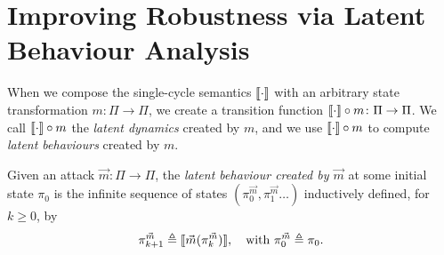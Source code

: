 {\section{Improving Robustness via Latent Behaviour Analysis}
\label{sec:CPSRobustness:LatentBehaviours} 
When we compose the single-cycle semantics ${{{\llbracket\cdot\rrbracket}}}$ with an arbitrary state transformation $m\colon \Pi\rightarrow\Pi$, we create a transition function ${{{\llbracket\cdot\rrbracket}}}\circ m\colon\Pi\rightarrow\Pi$. We call ${{{\llbracket\cdot\rrbracket}}}\circ m$ the \emph{latent dynamics} created by $m$, and we use ${{{\llbracket\cdot\rrbracket}}}\circ m$ to compute \emph{latent behaviours} created by $m$.%

\begin{definition}
  \label{def:CPSRobustness:LatentBehaviour}
  Given an attack $\vec{m}\colon \Pi\rightarrow \Pi$, the \emph{latent behaviour created by $\vec{m}$} at some initial state $\pi_0$ is the infinite sequence of states $(\pi^{\vec{m}}_0, \pi^{\vec{m}}_1\ldots)$ inductively defined, for $k\geq 0$, by 
  \begin{align}
    \label{eq:newkCycle}
    {\pi}^{\vec{m}}_{k+1}\triangleq {{\llbracket\vec{m}({\pi}^{\vec{m}}_{k})\rrbracket}}, \quad \text{with ${\pi^{\vec{m}}_{0}}\triangleq \pi_0$.}
  \end{align}
\end{definition}
}
